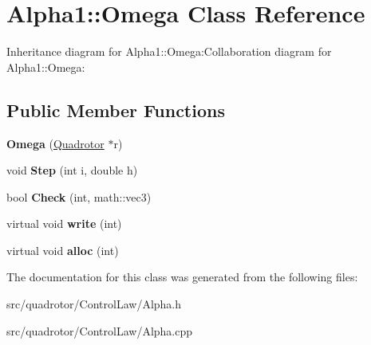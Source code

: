 \hypertarget{classAlpha1_1_1Omega}{
\section{Alpha1::Omega Class Reference}
\label{classAlpha1_1_1Omega}
}
Inheritance diagram for Alpha1::Omega:Collaboration diagram for Alpha1::Omega:\subsection*{Public Member Functions}
\begin{DoxyCompactItemize}
\item 
\hypertarget{classAlpha1_1_1Omega_a32a0b92a692f2e8aeecab24d5679bfaf}{
{\bfseries Omega} (\hyperlink{classQuadrotor}{Quadrotor} $\ast$r)}
\label{classAlpha1_1_1Omega_a32a0b92a692f2e8aeecab24d5679bfaf}

\item 
\hypertarget{classAlpha1_1_1Omega_ad5ee7dce47604f655179fa60a262e993}{
void {\bfseries Step} (int i, double h)}
\label{classAlpha1_1_1Omega_ad5ee7dce47604f655179fa60a262e993}

\item 
\hypertarget{classAlpha1_1_1Omega_a1e6326c0e02fa47343c92e22adaa37c1}{
bool {\bfseries Check} (int, math::vec3)}
\label{classAlpha1_1_1Omega_a1e6326c0e02fa47343c92e22adaa37c1}

\item 
\hypertarget{classAlpha1_1_1Omega_a43530dec2383d0dc669faf55f4d3aab8}{
virtual void {\bfseries write} (int)}
\label{classAlpha1_1_1Omega_a43530dec2383d0dc669faf55f4d3aab8}

\item 
\hypertarget{classAlpha1_1_1Omega_ad24c9b64337b0a74c42675590664ed7c}{
virtual void {\bfseries alloc} (int)}
\label{classAlpha1_1_1Omega_ad24c9b64337b0a74c42675590664ed7c}

\end{DoxyCompactItemize}


The documentation for this class was generated from the following files:\begin{DoxyCompactItemize}
\item 
src/quadrotor/ControlLaw/Alpha.h\item 
src/quadrotor/ControlLaw/Alpha.cpp\end{DoxyCompactItemize}
